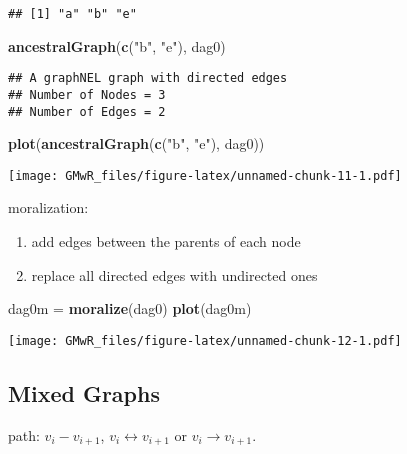 \documentclass[]{article}
\newenvironment{Shaded}{\begin{snugshade}}{\end{snugshade}}
\newcommand{\KeywordTok}[1]{\textcolor[rgb]{0.13,0.29,0.53}{\textbf{#1}}}
\newcommand{\StringTok}[1]{\textcolor[rgb]{0.31,0.60,0.02}{#1}}
\newcommand{\NormalTok}[1]{#1}
\providecommand{\tightlist}{%
  \setlength{\itemsep}{0pt}\setlength{\parskip}{0pt}}
\begin{document}
\begin{verbatim}
## [1] "a" "b" "e"
\end{verbatim}

\begin{Shaded}
\begin{Highlighting}[]
\KeywordTok{ancestralGraph}\NormalTok{(}\KeywordTok{c}\NormalTok{(}\StringTok{"b"}\NormalTok{, }\StringTok{"e"}\NormalTok{), dag0)}
\end{Highlighting}
\end{Shaded}

\begin{verbatim}
## A graphNEL graph with directed edges
## Number of Nodes = 3 
## Number of Edges = 2
\end{verbatim}

\begin{Shaded}
\begin{Highlighting}[]
\KeywordTok{plot}\NormalTok{(}\KeywordTok{ancestralGraph}\NormalTok{(}\KeywordTok{c}\NormalTok{(}\StringTok{"b"}\NormalTok{, }\StringTok{"e"}\NormalTok{), dag0))}
\end{Highlighting}
\end{Shaded}

\texttt{[image: GMwR\_files/figure-latex/unnamed-chunk-11-1.pdf]}

moralization:

\begin{enumerate}
\def\labelenumi{\arabic{enumi}.}
\tightlist
\item
  add edges between the parents of each node
\item
  replace all directed edges with undirected ones
\end{enumerate}

\begin{Shaded}
\begin{Highlighting}[]
\NormalTok{dag0m =}\StringTok{ }\KeywordTok{moralize}\NormalTok{(dag0)}
\KeywordTok{plot}\NormalTok{(dag0m)}
\end{Highlighting}
\end{Shaded}

\texttt{[image: GMwR\_files/figure-latex/unnamed-chunk-12-1.pdf]}

\subsection{Mixed Graphs}\label{mixed-graphs}

path: \(v_i-v_{i+1}\), \(v_i\leftrightarrow v_{i+1}\) or
\(v_i\rightarrow v_{i+1}\).
\end{document}
